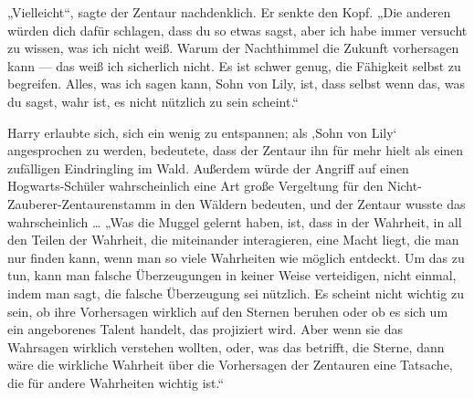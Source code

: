 „Vielleicht“, sagte der Zentaur nachdenklich. Er senkte den Kopf.
„Die anderen würden dich dafür schlagen, dass du so etwas sagst, aber ich habe immer versucht zu wissen, was ich nicht weiß. Warum der Nachthimmel die Zukunft vorhersagen kann — das weiß ich sicherlich nicht. Es ist schwer genug, die Fähigkeit selbst zu begreifen. Alles, was ich sagen kann, Sohn von Lily, ist, dass selbst wenn das, was du sagst, wahr ist, es nicht nützlich zu sein scheint.“

Harry erlaubte sich, sich ein wenig zu entspannen; als ‚Sohn von Lily‘ angesprochen zu werden, bedeutete, dass der Zentaur ihn für mehr hielt als einen zufälligen Eindringling im Wald. Außerdem würde der Angriff auf einen Hogwarts-Schüler wahrscheinlich eine Art große Vergeltung für den Nicht-Zauberer-Zentaurenstamm in den Wäldern bedeuten, und der Zentaur wusste das wahrscheinlich …
„Was die Muggel gelernt haben, ist, dass in der Wahrheit, in all den Teilen der Wahrheit, die miteinander interagieren, eine Macht liegt, die man nur finden kann, wenn man so viele Wahrheiten wie möglich entdeckt. Um das zu tun, kann man falsche Überzeugungen in keiner Weise verteidigen, nicht einmal, indem man sagt, die falsche Überzeugung sei nützlich. Es scheint nicht wichtig zu sein, ob ihre Vorhersagen wirklich auf den Sternen beruhen oder ob es sich um ein angeborenes Talent handelt, das projiziert wird. Aber wenn sie das Wahrsagen wirklich verstehen wollten, oder, was das betrifft, die Sterne, dann wäre die wirkliche Wahrheit über die Vorhersagen der Zentauren eine Tatsache, die für andere Wahrheiten wichtig ist.“

